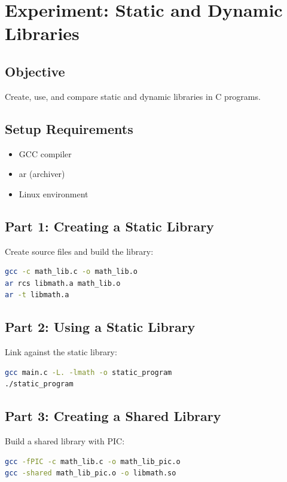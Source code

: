 \section{Experiment: Static and Dynamic Libraries}

\subsection{Objective}
Create, use, and compare static and dynamic libraries in C programs.

\subsection{Setup Requirements}
\begin{itemize}
\item GCC compiler
\item ar (archiver)
\item Linux environment
\end{itemize}

\subsection{Part 1: Creating a Static Library}

Create source files and build the library:

\begin{lstlisting}[language=bash]
gcc -c math_lib.c -o math_lib.o
ar rcs libmath.a math_lib.o
ar -t libmath.a
\end{lstlisting}

\subsection{Part 2: Using a Static Library}

Link against the static library:

\begin{lstlisting}[language=bash]
gcc main.c -L. -lmath -o static_program
./static_program
\end{lstlisting}

\subsection{Part 3: Creating a Shared Library}

Build a shared library with PIC:

\begin{lstlisting}[language=bash]
gcc -fPIC -c math_lib.c -o math_lib_pic.o
gcc -shared math_lib_pic.o -o libmath.so
\end{lstlisting}

